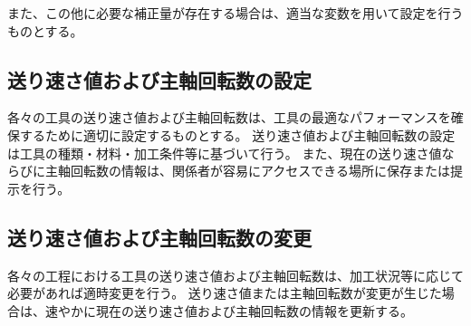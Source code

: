 また、この他に必要な補正量が存在する場合は、適当な変数を用いて設定を行うものとする。




\subsection{送り速さ値および主軸回転数の設定}
各々の工具の送り速さ値および主軸回転数は、工具の最適なパフォーマンスを確保するために適切に設定するものとする。
送り速さ値および主軸回転数の設定は工具の種類・材料・加工条件等に基づいて行う。
また、現在の送り速さ値ならびに主軸回転数の情報は、関係者が容易にアクセスできる場所に保存または提示を行う。

\subsection{送り速さ値および主軸回転数の変更}
各々の工程における工具の送り速さ値および主軸回転数は、加工状況等に応じて必要があれば適時変更を行う。
送り速さ値または主軸回転数が変更が生じた場合は、速やかに現在の送り速さ値および主軸回転数の情報を更新する。
